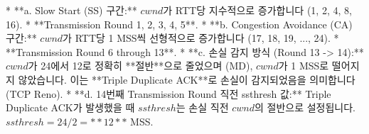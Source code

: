 *   **a. Slow Start (SS) 구간:** $cwnd$가 RTT당 지수적으로 증가합니다 (1, 2, 4, 8, 16).
    *   **Transmission Round 1, 2, 3, 4, 5**.
*   **b. Congestion Avoidance (CA) 구간:** $cwnd$가 RTT당 1 MSS씩 선형적으로 증가합니다 (17, 18, 19, ..., 24).
    *   **Transmission Round 6 through 13**.
*   **c. 손실 감지 방식 (Round 13 -> 14):** $cwnd$가 24에서 12로 정확히 **절반**으로 줄었으며 (MD), $cwnd$가 1 MSS로 떨어지지 않았습니다. 이는 **Triple Duplicate ACK**로 손실이 감지되었음을 의미합니다 (TCP Reno).
*   **d. 14번째 Transmission Round 직전 ssthresh 값:** Triple Duplicate ACK가 발생했을 때 $ssthresh$는 손실 직전 $cwnd$의 절반으로 설정됩니다. $ssthresh = 24 / 2 = **12**$ MSS.